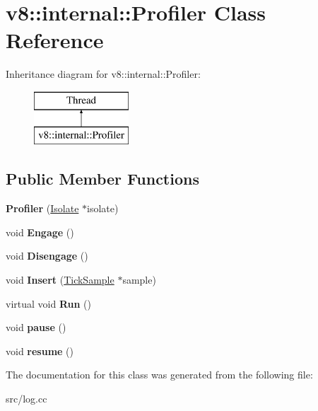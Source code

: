 \hypertarget{classv8_1_1internal_1_1_profiler}{}\section{v8\+:\+:internal\+:\+:Profiler Class Reference}
\label{classv8_1_1internal_1_1_profiler}
Inheritance diagram for v8\+:\+:internal\+:\+:Profiler\+:\begin{figure}[H]
\begin{center}
\leavevmode
\includegraphics[height=2.000000cm]{classv8_1_1internal_1_1_profiler}
\end{center}
\end{figure}
\subsection*{Public Member Functions}
\begin{DoxyCompactItemize}
\item 
\hypertarget{classv8_1_1internal_1_1_profiler_a183ac1da05bdb6f14004fe2b72d330f8}{}{\bfseries Profiler} (\hyperlink{classv8_1_1internal_1_1_isolate}{Isolate} $\ast$isolate)\label{classv8_1_1internal_1_1_profiler_a183ac1da05bdb6f14004fe2b72d330f8}

\item 
\hypertarget{classv8_1_1internal_1_1_profiler_a5fde7f32f57422fb4a946e3c6c23a0b8}{}void {\bfseries Engage} ()\label{classv8_1_1internal_1_1_profiler_a5fde7f32f57422fb4a946e3c6c23a0b8}

\item 
\hypertarget{classv8_1_1internal_1_1_profiler_aa4bf57a012df19cf1a5760086726930e}{}void {\bfseries Disengage} ()\label{classv8_1_1internal_1_1_profiler_aa4bf57a012df19cf1a5760086726930e}

\item 
\hypertarget{classv8_1_1internal_1_1_profiler_aa16ebe6474f389da1823168299163ae1}{}void {\bfseries Insert} (\hyperlink{structv8_1_1internal_1_1_tick_sample}{Tick\+Sample} $\ast$sample)\label{classv8_1_1internal_1_1_profiler_aa16ebe6474f389da1823168299163ae1}

\item 
\hypertarget{classv8_1_1internal_1_1_profiler_a50d91468733e852bbb37cc7249f98bb7}{}virtual void {\bfseries Run} ()\label{classv8_1_1internal_1_1_profiler_a50d91468733e852bbb37cc7249f98bb7}

\item 
\hypertarget{classv8_1_1internal_1_1_profiler_a6d5b6053f67b64fab12a5b891cf4adf5}{}void {\bfseries pause} ()\label{classv8_1_1internal_1_1_profiler_a6d5b6053f67b64fab12a5b891cf4adf5}

\item 
\hypertarget{classv8_1_1internal_1_1_profiler_a4c9f3df2a75d5c6d26341b959f703a8d}{}void {\bfseries resume} ()\label{classv8_1_1internal_1_1_profiler_a4c9f3df2a75d5c6d26341b959f703a8d}

\end{DoxyCompactItemize}


The documentation for this class was generated from the following file\+:\begin{DoxyCompactItemize}
\item 
src/log.\+cc\end{DoxyCompactItemize}
